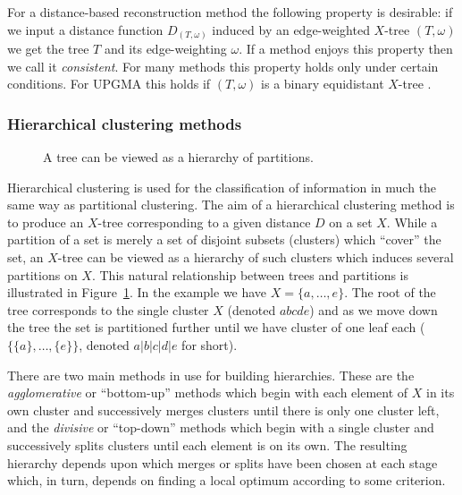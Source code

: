 For a distance-based reconstruction method the following property is
desirable: if we input a distance function $D_{(T,\omega)}$ induced by an
edge-weighted $X$-tree $(T,\omega)$ we get the tree $T$ and its edge-weighting
$\omega$.  If a method enjoys this property then we call it
\textit{consistent}.  For many methods this property holds only under certain
conditions.  For UPGMA this holds if $(T,\omega)$ is a binary equidistant
$X$-tree \cite{durbin1998biological}.

\subsubsection{Hierarchical clustering methods}
\label{sec:hier-clust-meth}

\begin{figure}
  \centering
  
  \caption{A tree can be viewed as a hierarchy of partitions.}
  \label{fig:tree-clust-ex}
\end{figure}

Hierarchical clustering is used for the classification of information in much
the same way as partitional clustering.  The aim of a hierarchical clustering
method is to produce an $X$-tree corresponding to a given distance $D$ on a
set $X$.  While a partition of a set is merely a set of disjoint subsets
(clusters) which ``cover'' the set, an $X$-tree can be viewed as a hierarchy
of such clusters which induces several partitions on $X$.  This natural
relationship between trees and partitions is illustrated in
Figure~\ref{fig:tree-clust-ex}.  In the example we have $X = \{a,\dotsc,e\}$.
The root of the tree corresponds to the single cluster $X$ (denoted $abcde$)
and as we move down the tree the set is partitioned further until we have
cluster of one leaf each ($\{\{a\},\dotsc,\{e\}\}$, denoted $a|b|c|d|e$ for
short).

There are two main methods in use for building hierarchies.  These are the
\textit{agglomerative} or ``bottom-up'' methods which begin with each element
of $X$ in its own cluster and successively merges clusters until there is only
one cluster left, and the \textit{divisive} or ``top-down'' methods which
begin with a single cluster and successively splits clusters until each
element is on its own.  The resulting hierarchy depends upon which merges or
splits have been chosen at each stage which, in turn, depends on finding a
local optimum according to some criterion.

